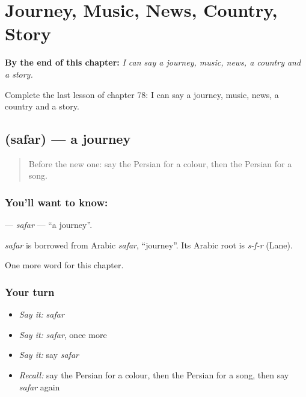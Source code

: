 
\chapter{Journey, Music, News, Country, Story}
\label{ch:fa-journey-music-news-country-story}

\begin{chapteropening}
\textbf{By the end of this chapter:} \emph{I can say a journey, music, news, a country and a story.}

Complete the last lesson of chapter 78: I can say a journey, music, news, a country and a story.
\end{chapteropening}

\section[\texorpdfstring{\fa{سفر} (safar)}{سفر (safar)}]{ (safar) — a journey}

\label{lesson:FA-C78-safar}



\begin{quote}
Before the new one: say the Persian for a colour, then the Persian for a song.
\end{quote}

\subsection*{You'll want to know: }
\textbf{} — \emph{safar} — \textquotedblleft{}a journey\textquotedblright{}.

\begin{cousinweb}
\emph{safar} is borrowed from Arabic \emph{safar}, \textquotedblleft{}journey\textquotedblright{}. Its Arabic root is \emph{s-f-r} (Lane).
\end{cousinweb}

\begin{grammarlens}[title={What you've built}]
One more word for this chapter.
\end{grammarlens}

\subsection*{Your turn}
\begin{itemize}
\raggedright
  \item \emph{Say it:} \emph{safar}
  \item \emph{Say it:} \emph{safar}, once more
  \item \emph{Say it:} say \emph{safar}
  \item \emph{Recall:} say the Persian for a colour, then the Persian for a song, then say \emph{safar} again
\end{itemize}

